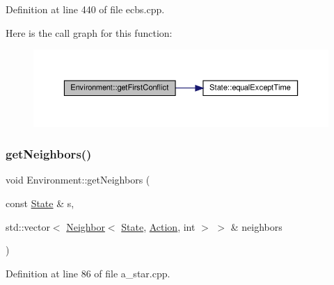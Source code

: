 Definition at line 440 of file ecbs.\+cpp.

Here is the call graph for this function\+:
\nopagebreak
\begin{figure}[H]
\begin{center}
\leavevmode
\includegraphics[width=350pt]{class_environment_a666d55a1f0bbc038d3662b75f400faa4_cgraph}
\end{center}
\end{figure}
\mbox{\label{class_environment_a4ae69480c6b9e716f282839dc4f323c0}} 
\subsubsection{\texorpdfstring{get\+Neighbors()}{getNeighbors()}\hspace{0.1cm}{\footnotesize\ttfamily [1/4]}}
{\footnotesize\ttfamily void Environment\+::get\+Neighbors (\begin{DoxyParamCaption}\item[{const \hyperlink{struct_state}{State} \&}]{s,  }\item[{std\+::vector$<$ \hyperlink{structlib_multi_robot_planning_1_1_neighbor}{Neighbor}$<$ \hyperlink{struct_state}{State}, \hyperlink{a__star_8cpp_a8bb1ef53467e4f61410d12822d922498}{Action}, int $>$ $>$ \&}]{neighbors }\end{DoxyParamCaption})\hspace{0.3cm}{\ttfamily [inline]}}



Definition at line 86 of file a\+\_\+star.\+cpp.

\mbox{\label{class_environment_a4ae69480c6b9e716f282839dc4f323c0}} 
